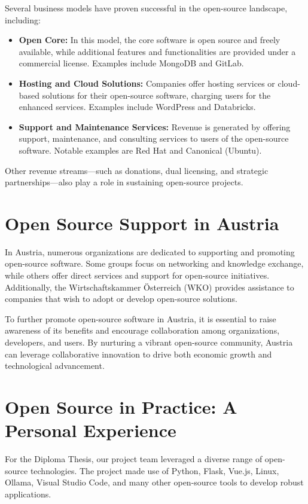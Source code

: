 Several business models have proven successful in the open-source landscape, including:
\begin{itemize}
    \item \textbf{Open Core:} In this model, the core software is open source and freely available, while additional features and functionalities are provided under a commercial license. Examples include MongoDB and GitLab.
    \item \textbf{Hosting and Cloud Solutions:} Companies offer hosting services or cloud-based solutions for their open-source software, charging users for the enhanced services. Examples include WordPress and Databricks.
    \item \textbf{Support and Maintenance Services:} Revenue is generated by offering support, maintenance, and consulting services to users of the open-source software. Notable examples are Red Hat and Canonical (Ubuntu).
\end{itemize}

Other revenue streams—such as donations, dual licensing, and strategic partnerships—also play a role in sustaining open-source projects.

\section{Open Source Support in Austria}

In Austria, numerous organizations are dedicated to supporting and promoting open-source software. 
Some groups focus on networking and knowledge exchange, while others offer direct services and support for open-source initiatives. 
Additionally, the Wirtschaftskammer Österreich (WKO) provides assistance to companies that wish to adopt or develop open-source solutions.

To further promote open-source software in Austria, 
it is essential to raise awareness of its benefits and encourage collaboration among organizations, developers, and users. 
By nurturing a vibrant open-source community, Austria can leverage collaborative innovation to drive both economic growth and technological advancement.

\cite{Open-Source-Guide-Austria}

\section{Open Source in Practice: A Personal Experience}

For the Diploma Thesis, our project team leveraged a diverse range of open-source technologies. 
The project made use of Python, Flask, Vue.js, Linux, Ollama, Visual Studio Code, 
and many other open-source tools to develop robust applications.

